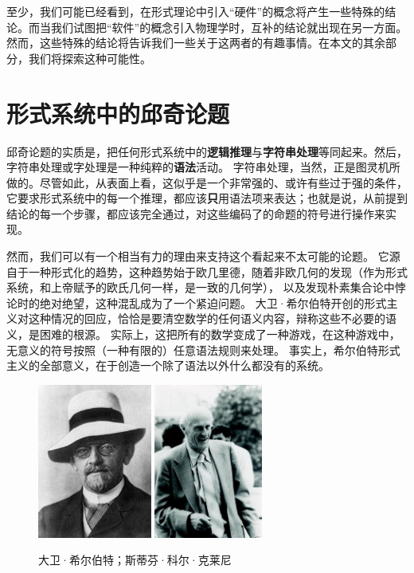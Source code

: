 \documentclass[a4paper,12pt]{article}
\begin{document}
至少，我们可能已经看到，在形式理论中引入“硬件”的概念将产生一些特殊的结论。而当我们试图把“软件”的概念引入物理学时，互补的结论就出现在另一方面。
然而，这些特殊的结论将告诉我们一些关于这两者的有趣事情。在本文的其余部分，我们将探索这种可能性。

\section{形式系统中的邱奇论题}

邱奇论题的实质是，把任何形式系统中的\textbf{逻辑推理}与\textbf{字符串处理}等同起来。然后，字符串处理或字处理是一种纯粹的\textbf{语法}活动。
字符串处理，当然，正是图灵机所做的。尽管如此，从表面上看，这似乎是一个非常强的、或许有些过于强的条件，
它要求形式系统中的每一个推理，都应该\textbf{只}用语法项来表达；也就是说，从前提到结论的每一个步骤，都应该完全通过，对这些编码了的命题的符号进行操作来实现。

然而，我们可以有一个相当有力的理由来支持这个看起来不太可能的论题。
它源自于一种形式化的趋势，这种趋势始于欧几里德，随着非欧几何的发现（作为形式系统，和上帝赋予的欧氏几何一样，是一致的几何学），
以及发现朴素集合论中悖论时的绝对绝望，这种混乱成为了一个紧迫问题。
大卫·希尔伯特开创的形式主义对这种情况的回应，恰恰是要清空数学的任何语义内容，辩称这些不必要的语义，是困难的根源。
实际上，这把所有的数学变成了一种游戏，在这种游戏中，无意义的符号按照（一种有限的）任意语法规则来处理。
事实上，希尔伯特形式主义的全部意义，在于创造一个除了语法以外什么都没有的系统。

\begin{figure}[ht]
\centering
\includegraphics[height=2.0in]{images/hilbert.jpg}
\includegraphics[height=2.0in]{images/kleene.jpg}
\caption{大卫·希尔伯特；斯蒂芬·科尔·克莱尼}
\end{figure}
\end{document}
